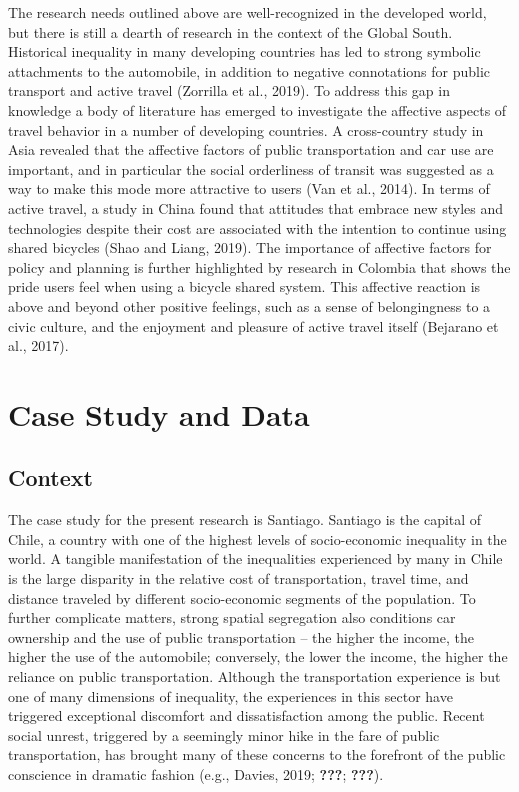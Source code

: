 \documentclass[]{elsarticle} %
\begin{document}
The research needs outlined above are well-recognized in the developed
world, but there is still a dearth of research in the context of the
Global South. Historical inequality in many developing countries has led
to strong symbolic attachments to the automobile, in addition to
negative connotations for public transport and active travel (Zorrilla
et al., 2019). To address this gap in knowledge a body of literature has
emerged to investigate the affective aspects of travel behavior in a
number of developing countries. A cross-country study in Asia revealed
that the affective factors of public transportation and car use are
important, and in particular the social orderliness of transit was
suggested as a way to make this mode more attractive to users (Van et
al., 2014). In terms of active travel, a study in China found that
attitudes that embrace new styles and technologies despite their cost
are associated with the intention to continue using shared bicycles
(Shao and Liang, 2019). The importance of affective factors for policy
and planning is further highlighted by research in Colombia that shows
the pride users feel when using a bicycle shared system. This affective
reaction is above and beyond other positive feelings, such as a sense of
belongingness to a civic culture, and the enjoyment and pleasure of
active travel itself (Bejarano et al., 2017).

\hypertarget{case-study-and-data}{%
\section{Case Study and Data}\label{case-study-and-data}}

\hypertarget{context}{%
\subsection{Context}\label{context}}

The case study for the present research is Santiago. Santiago is the
capital of Chile, a country with one of the highest levels of
socio-economic inequality in the world. A tangible manifestation of the
inequalities experienced by many in Chile is the large disparity in the
relative cost of transportation, travel time, and distance traveled by
different socio-economic segments of the population. To further
complicate matters, strong spatial segregation also conditions car
ownership and the use of public transportation -- the higher the income,
the higher the use of the automobile; conversely, the lower the income,
the higher the reliance on public transportation. Although the
transportation experience is but one of many dimensions of inequality,
the experiences in this sector have triggered exceptional discomfort and
dissatisfaction among the public. Recent social unrest, triggered by a
seemingly minor hike in the fare of public transportation, has brought
many of these concerns to the forefront of the public conscience in
dramatic fashion (e.g., Davies, 2019; {\textbf{???}}; {\textbf{???}}).
\end{document}
